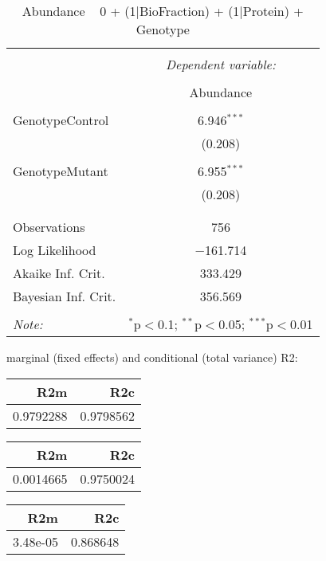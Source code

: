 \documentclass[11pt]{report}
\begin{document}
\begin{table}[!htbp] \centering 
  \caption{Abundance ~ 0 + (1|BioFraction) + (1|Protein) + Genotype} 
  \label{} 
\begin{tabular}{@{\extracolsep{5pt}}lc} 
\\[-1.8ex]\hline 
\hline \\[-1.8ex] 
 & \multicolumn{1}{c}{\textit{Dependent variable:}} \\ 
\cline{2-2} 
\\[-1.8ex] & Abundance \\ 
\hline \\[-1.8ex] 
 GenotypeControl & 6.946$^{***}$ \\ 
  & (0.208) \\ 
  & \\ 
 GenotypeMutant & 6.955$^{***}$ \\ 
  & (0.208) \\ 
  & \\ 
\hline \\[-1.8ex] 
Observations & 756 \\ 
Log Likelihood & $-$161.714 \\ 
Akaike Inf. Crit. & 333.429 \\ 
Bayesian Inf. Crit. & 356.569 \\ 
\hline 
\hline \\[-1.8ex] 
\textit{Note:}  & \multicolumn{1}{r}{$^{*}$p$<$0.1; $^{**}$p$<$0.05; $^{***}$p$<$0.01} \\ 
\end{tabular} 
\end{table} 
marginal (fixed effects) and conditional (total variance) R2:

\begin{tabular}{r|r}
\hline
R2m & R2c\\
\hline
0.9792288 & 0.9798562\\
\hline
\end{tabular}

\begin{tabular}{r|r}
\hline
R2m & R2c\\
\hline
0.0014665 & 0.9750024\\
\hline
\end{tabular}

\begin{tabular}{r|r}
\hline
R2m & R2c\\
\hline
3.48e-05 & 0.868648\\
\hline
\end{tabular}
\end{document}
